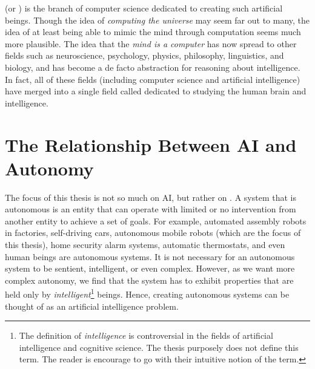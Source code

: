  (or ) is the branch of computer science dedicated to creating such artificial beings. Though the idea of \textit{computing the universe} may seem far out to many, the idea of at least being able to mimic the mind through computation seems much more plausible. The idea that the \textit{mind is a computer} has now spread to other fields such as neuroscience, psychology, physics, philosophy, linguistics, and biology, and has become a de facto abstraction for reasoning about intelligence. In fact, all of these fields (including computer science and artificial intelligence) have merged into a single field called  dedicated to studying the human brain and intelligence.

\section{The Relationship Between AI and Autonomy}
The focus of this thesis is not so much on AI, but rather on . A system that is autonomous is an entity that can operate with limited or no intervention from another entity to achieve a set of goals. For example, automated assembly robots in factories, self-driving cars, autonomous mobile robots (which are the focus of this thesis), home security alarm systems, automatic thermostats, and even human beings are autonomous systems. It is not necessary for an autonomous system to be sentient, intelligent, or even complex. However, as we want more complex autonomy, we find that the system has to exhibit properties that are held only by \textit{intelligent}\footnote{The definition of \textit{intelligence} is controversial in the fields of artificial intelligence and cognitive science. The thesis purposely does not define this term. The reader is encourage to go with their intuitive notion of the term.} beings. Hence, creating autonomous systems can be thought of as an artificial intelligence problem.

